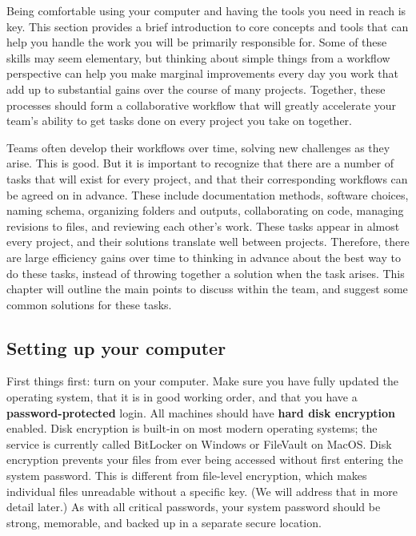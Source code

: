 Being comfortable using your computer and having the tools you need in reach is key.
This section provides a brief introduction to core concepts and tools
that can help you handle the work you will be primarily responsible for.
Some of these skills may seem elementary,
but thinking about simple things from a workflow perspective
can help you make marginal improvements every day you work
that add up to substantial gains over the course of many projects.
Together, these processes should form a collaborative workflow
that will greatly accelerate your team's ability to get tasks done
on every project you take on together.

Teams often develop their workflows over time,
solving new challenges as they arise.
This is good. But it is important to recognize
that there are a number of tasks that will exist for every project,
and that their corresponding workflows can be agreed on in advance.
These include documentation methods, software choices,
naming schema, organizing folders and outputs, collaborating on code,
managing revisions to files, and reviewing each other's work.
These tasks appear in almost every project,
and their solutions translate well between projects.
Therefore, there are large efficiency gains over time to
thinking in advance about the best way to do these tasks,
instead of throwing together a solution when the task arises.
This chapter will outline the main points to discuss within the team,
and suggest some common solutions for these tasks.

\subsection{Setting up your computer}

First things first: turn on your computer.
Make sure you have fully updated the operating system,
that it is in good working order,
and that you have a \textbf{password-protected} login.
All machines should have \textbf{hard disk encryption} enabled.
Disk encryption is built-in on most modern operating systems;
the service is currently called BitLocker on Windows or FileVault on MacOS.
Disk encryption prevents your files from ever being accessed
without first entering the system password.
This is different from file-level encryption,
which makes individual files unreadable without a specific key.
(We will address that in more detail later.)
As with all critical passwords, your system password should be strong,
memorable, and backed up in a separate secure location.

